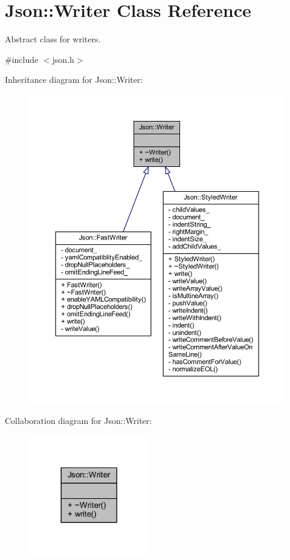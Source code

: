 \hypertarget{class_json_1_1_writer}{}\section{Json\+:\+:Writer Class Reference}
\label{class_json_1_1_writer}


Abstract class for writers.  




{\ttfamily \#include $<$json.\+h$>$}



Inheritance diagram for Json\+:\+:Writer\+:\nopagebreak
\begin{figure}[H]
\begin{center}
\leavevmode
\includegraphics[width=350pt]{class_json_1_1_writer__inherit__graph}
\end{center}
\end{figure}


Collaboration diagram for Json\+:\+:Writer\+:\nopagebreak
\begin{figure}[H]
\begin{center}
\leavevmode
\includegraphics[width=149pt]{class_json_1_1_writer__coll__graph}
\end{center}
\end{figure}
